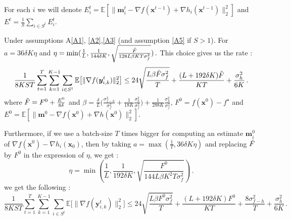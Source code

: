 \documentclass[10pt]{article} %
\theoremstyle{plain}
\theoremstyle{definition}
\theoremstyle{remark}
\newcommand{\norm}[1]{\|#1\|_2}
\def\vm{{\bm{m}}}
\def\vx{{\bm{x}}}
\def\vy{{\bm{y}}}
\newcommand{\E}{\mathbb{E}}
\begin{document}
For each $i$ we will denote $E_i^t = \E[\norm{\vm_i^t - \nabla f(\vx^{t-1}) + \nabla h_i(\vx^{t-1})}^2]$ and $E^t = \frac{1}{S}\sum_{i\in S^t} E_i^t$.

\begin{framedtheorem}
Under assumptions A\ref{A1}, \ref{A2},\ref{A3} (and assumption \ref{A5} if $S>1$). For $a = 36 \delta K\eta$ and 
$\eta = \min(\frac{1}{L},\frac{1}{144\delta K}, \sqrt{\frac{\Tilde{F}}{128L\beta KT\sigma_f^2}})\, .$
This choice gives us the rate :
$$\frac{1}{8KST}\sum_{t=1}^T\sum_{k=1}^{K-1}\sum_{i\in S^t} \E\big[\norm{\nabla f(\vy^t_{i,k})}^2\big] \leq 24 \sqrt{\frac{L\beta\Tilde{F}\sigma_f^2}{T}} + \frac{(L + 192 \delta K)\Tilde{F}}{KT}+ \frac{\sigma_h^2}{6K}\, .$$
where $\Tilde{F} = F^{0} + \frac{E^0}{8 \delta}$ and $\beta = \frac{\delta}{L}\bigg(\frac{\sigma_{f-h}^2}{\sigma_f^2} + \frac{1}{18K}\frac{\sigma_h^2}{\sigma_f^2}\bigg) + \frac{1}{288K}\frac{\sigma_h^2}{\sigma_f^2}$, $F^0 = f(\vx^0) - f^\star$ and $E^0 = \E[\norm{\vm^0 - \nabla f(\vx^0) + \nabla h(\vx^0)}^2]$.

Furthermore, if we use a batch-size  $T$ times bigger for computing an estimate $\vm^0_i$ of $\nabla f(\vx^0) - \nabla h_i(\vx_0)$, then by taking $a = \max(\frac{1}{T},36\delta K\eta)$ and replacing $\Tilde{F}$ by $F^0$ in the expression of $\eta$, we get :
$$\eta = \min(\frac{1}{L},\frac{1}{192\delta K}, \sqrt{\frac{F^0}{144L\beta K^2T\sigma_f^2}})\, .$$
we get the following :
$$\frac{1}{8KST}\sum_{t=1}^T\sum_{k=1}^{K-1}\sum_{i\in S^t} \E\big[\norm{\nabla f(\vy^t_{i,k})}^2\big] \leq 24 \sqrt{\frac{L\beta F^0\sigma_f^2}{T}} + \frac{(L + 192 \delta K)F^0}{KT} + \frac{8\sigma_{f-h}^2}{T} + \frac{\sigma_h^2}{6K}\, .$$
\end{framedtheorem}
\end{document}
